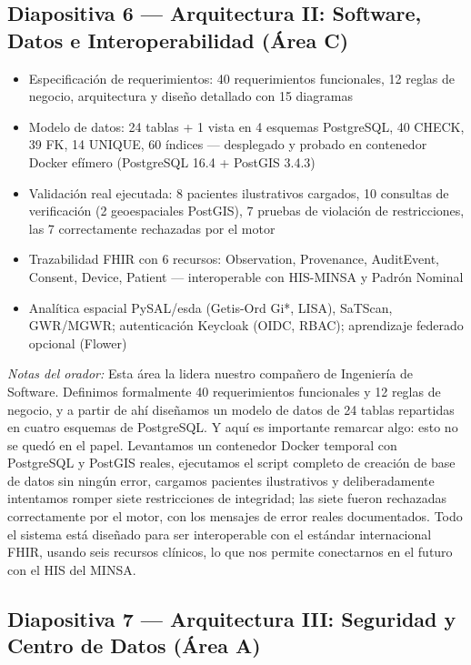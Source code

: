 \documentclass[11pt,a4paper]{article}
\providecommand{\tightlist}{%
  \setlength{\itemsep}{0pt}\setlength{\parskip}{0pt}}
\begin{document}
\subsection{Diapositiva 6 --- Arquitectura II: Software, Datos e Interoperabilidad (Área C)}\label{diapositiva-6-arquitectura-ii-software-datos-e-interoperabilidad-uxe1rea-c}

\begin{itemize}
\tightlist
\item
  Especificación de requerimientos: 40 requerimientos funcionales, 12 reglas de negocio, arquitectura y diseño detallado con 15 diagramas
\item
  Modelo de datos: 24 tablas + 1 vista en 4 esquemas PostgreSQL, 40 CHECK, 39 FK, 14 UNIQUE, 60 índices --- desplegado y probado en contenedor Docker efímero (PostgreSQL 16.4 + PostGIS 3.4.3)
\item
  Validación real ejecutada: 8 pacientes ilustrativos cargados, 10 consultas de verificación (2 geoespaciales PostGIS), 7 pruebas de violación de restricciones, las 7 correctamente rechazadas por el motor
\item
  Trazabilidad FHIR con 6 recursos: Observation, Provenance, AuditEvent, Consent, Device, Patient --- interoperable con HIS-MINSA y Padrón Nominal
\item
  Analítica espacial PySAL/esda (Getis-Ord Gi*, LISA), SaTScan, GWR/MGWR; autenticación Keycloak (OIDC, RBAC); aprendizaje federado opcional (Flower)
\end{itemize}

\emph{Notas del orador:} Esta área la lidera nuestro compañero de Ingeniería de Software. Definimos formalmente 40 requerimientos funcionales y 12 reglas de negocio, y a partir de ahí diseñamos un modelo de datos de 24 tablas repartidas en cuatro esquemas de PostgreSQL. Y aquí es importante remarcar algo: esto no se quedó en el papel. Levantamos un contenedor Docker temporal con PostgreSQL y PostGIS reales, ejecutamos el script completo de creación de base de datos sin ningún error, cargamos pacientes ilustrativos y deliberadamente intentamos romper siete restricciones de integridad; las siete fueron rechazadas correctamente por el motor, con los mensajes de error reales documentados. Todo el sistema está diseñado para ser interoperable con el estándar internacional FHIR, usando seis recursos clínicos, lo que nos permite conectarnos en el futuro con el HIS del MINSA.

\subsection{Diapositiva 7 --- Arquitectura III: Seguridad y Centro de Datos (Área A)}\label{diapositiva-7-arquitectura-iii-seguridad-y-centro-de-datos-uxe1rea-a}
\end{document}
